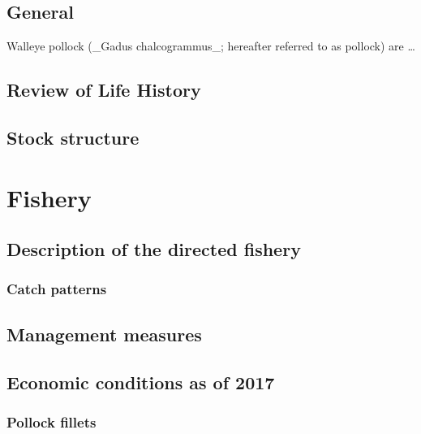 \documentclass[11pt,]{article}
\begin{document}
\hypertarget{general}{%
\subsection{General}\label{general}}

Walleye pollock (\_Gadus chalcogrammus\_; hereafter referred to as
pollock) are \ldots{}

\hypertarget{review-of-life-history}{%
\subsection{Review of Life History}\label{review-of-life-history}}

\hypertarget{stock-structure}{%
\subsection{Stock structure}\label{stock-structure}}

\hypertarget{fishery}{%
\section{Fishery}\label{fishery}}

\hypertarget{description-of-the-directed-fishery}{%
\subsection{Description of the directed
fishery}\label{description-of-the-directed-fishery}}

\hypertarget{catch-patterns}{%
\subsubsection{Catch patterns}\label{catch-patterns}}

\hypertarget{management-measures}{%
\subsection{Management measures}\label{management-measures}}

\hypertarget{economic-conditions-as-of-2017}{%
\subsection{Economic conditions as of
2017}\label{economic-conditions-as-of-2017}}

\hypertarget{pollock-fillets}{%
\subsubsection{Pollock fillets}\label{pollock-fillets}}
\end{document}
